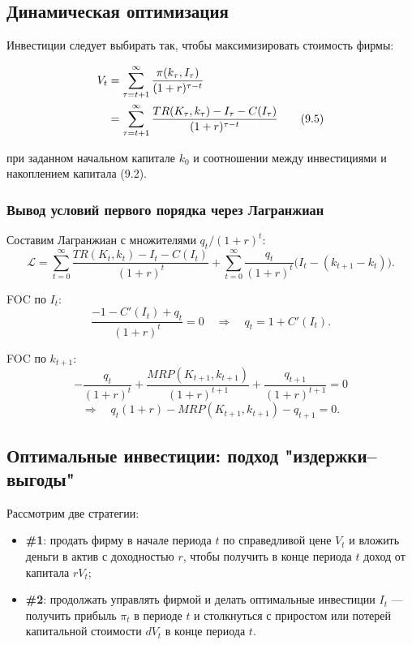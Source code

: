 \documentclass[10pt,a4paper]{article}
\begin{document}
\subsection{Динамическая оптимизация}

Инвестиции следует выбирать так, чтобы максимизировать стоимость фирмы:
\begin{formulabox}
\begin{align}
V_t &= \sum_{\tau=t+1}^{\infty}\frac{\pi(k_\tau,I_\tau)}{(1+r)^{\tau-t}} \notag\\
&= \sum_{\tau=t+1}^{\infty}\frac{TR(K_\tau,k_\tau) - I_\tau - C(I_\tau)}{(1+r)^{\tau-t}} \tag{9.5}
\end{align}
\end{formulabox}
при заданном начальном капитале $k_0$ и соотношении между инвестициями и накоплением капитала (9.2).

\subsubsection{Вывод условий первого порядка через Лагранжиан}

Составим Лагранжиан с множителями $q_t/(1+r)^t$:
$$\mathcal{L} = \sum_{t=0}^{\infty}\frac{TR(K_t,k_t) - I_t - C(I_t)}{(1+r)^{t}} + \sum_{t=0}^{\infty}\frac{q_t}{(1+r)^{t}}\big(I_t - (k_{t+1}-k_t)\big).$$

FOC по $I_t$:
$$\frac{-1-C'(I_t) + q_t}{(1+r)^{t}} = 0 \quad\Rightarrow\quad q_t = 1+C'(I_t).$$

FOC по $k_{t+1}$:
$$-\frac{q_t}{(1+r)^{t}} + \frac{MRP(K_{t+1},k_{t+1})}{(1+r)^{t+1}} + \frac{q_{t+1}}{(1+r)^{t+1}} = 0$$
$$\Rightarrow\quad q_{t}(1+r) - MRP(K_{t+1},k_{t+1}) - q_{t+1} = 0.$$

\subsection{Оптимальные инвестиции: подход "издержки--выгоды"}

Рассмотрим две стратегии:
\begin{itemize}[leftmargin=1.3em]
\item \textbf{\#1}: продать фирму в начале периода $t$ по справедливой цене $V_t$ и вложить деньги в актив с доходностью $r$, чтобы получить в конце периода $t$ доход от капитала $rV_t$;
\item \textbf{\#2}: продолжать управлять фирмой и делать оптимальные инвестиции $I_t$ — получить прибыль $\pi_t$ в периоде $t$ и столкнуться с приростом или потерей капитальной стоимости $dV_t$ в конце периода $t$.
\end{itemize}
\end{document}
